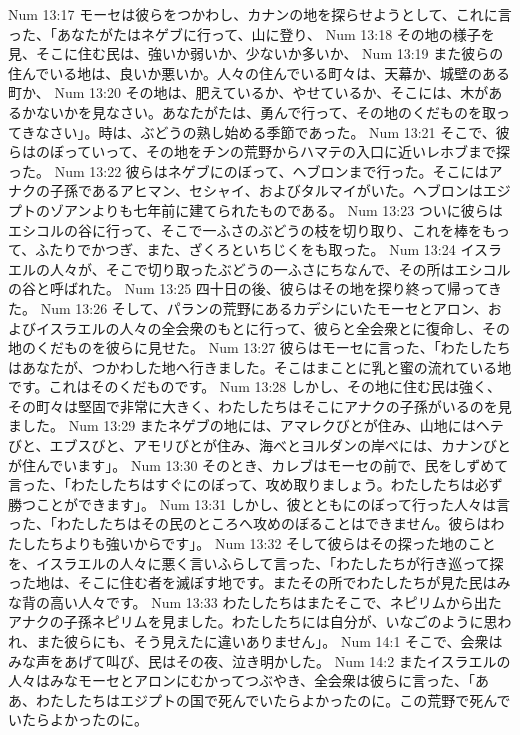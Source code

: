 Num 13:17  モーセは彼らをつかわし、カナンの地を探らせようとして、これに言った、「あなたがたはネゲブに行って、山に登り、
Num 13:18  その地の様子を見、そこに住む民は、強いか弱いか、少ないか多いか、
Num 13:19  また彼らの住んでいる地は、良いか悪いか。人々の住んでいる町々は、天幕か、城壁のある町か、
Num 13:20  その地は、肥えているか、やせているか、そこには、木があるかないかを見なさい。あなたがたは、勇んで行って、その地のくだものを取ってきなさい」。時は、ぶどうの熟し始める季節であった。
Num 13:21  そこで、彼らはのぼっていって、その地をチンの荒野からハマテの入口に近いレホブまで探った。
Num 13:22  彼らはネゲブにのぼって、ヘブロンまで行った。そこにはアナクの子孫であるアヒマン、セシャイ、およびタルマイがいた。ヘブロンはエジプトのゾアンよりも七年前に建てられたものである。
Num 13:23  ついに彼らはエシコルの谷に行って、そこで一ふさのぶどうの枝を切り取り、これを棒をもって、ふたりでかつぎ、また、ざくろといちじくをも取った。
Num 13:24  イスラエルの人々が、そこで切り取ったぶどうの一ふさにちなんで、その所はエシコルの谷と呼ばれた。
Num 13:25  四十日の後、彼らはその地を探り終って帰ってきた。
Num 13:26  そして、パランの荒野にあるカデシにいたモーセとアロン、およびイスラエルの人々の全会衆のもとに行って、彼らと全会衆とに復命し、その地のくだものを彼らに見せた。
Num 13:27  彼らはモーセに言った、「わたしたちはあなたが、つかわした地へ行きました。そこはまことに乳と蜜の流れている地です。これはそのくだものです。
Num 13:28  しかし、その地に住む民は強く、その町々は堅固で非常に大きく、わたしたちはそこにアナクの子孫がいるのを見ました。
Num 13:29  またネゲブの地には、アマレクびとが住み、山地にはヘテびと、エブスびと、アモリびとが住み、海べとヨルダンの岸べには、カナンびとが住んでいます」。
Num 13:30  そのとき、カレブはモーセの前で、民をしずめて言った、「わたしたちはすぐにのぼって、攻め取りましょう。わたしたちは必ず勝つことができます」。
Num 13:31  しかし、彼とともにのぼって行った人々は言った、「わたしたちはその民のところへ攻めのぼることはできません。彼らはわたしたちよりも強いからです」。
Num 13:32  そして彼らはその探った地のことを、イスラエルの人々に悪く言いふらして言った、「わたしたちが行き巡って探った地は、そこに住む者を滅ぼす地です。またその所でわたしたちが見た民はみな背の高い人々です。
Num 13:33  わたしたちはまたそこで、ネピリムから出たアナクの子孫ネピリムを見ました。わたしたちには自分が、いなごのように思われ、また彼らにも、そう見えたに違いありません」。
Num 14:1  そこで、会衆はみな声をあげて叫び、民はその夜、泣き明かした。
Num 14:2  またイスラエルの人々はみなモーセとアロンにむかってつぶやき、全会衆は彼らに言った、「ああ、わたしたちはエジプトの国で死んでいたらよかったのに。この荒野で死んでいたらよかったのに。
